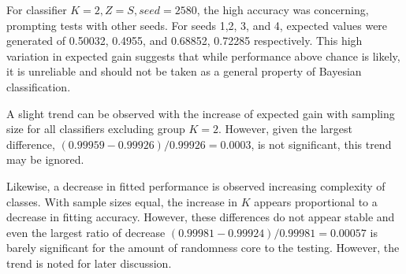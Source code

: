 \documentclass[10pt, conference]{IEEEtran}
\begin{document}
For classifier $K=2,Z=S,seed=2580$, the high accuracy was concerning, prompting tests with other seeds. For seeds 1,2, 3, and 4, expected values were generated of 0.50032, 0.4955, and 0.68852, 0.72285 respectively. This high variation in expected gain suggests that while performance above chance is likely, it is unreliable and should not be taken as a general property of Bayesian classification.

A slight trend can be observed with the increase of expected gain with sampling size for all classifiers excluding group $K=2$. However, given the largest difference, $(0.99959-0.99926)/0.99926 = 0.0003$, is not significant, this trend may be ignored. 

Likewise, a decrease in fitted performance is observed increasing complexity of classes. With sample sizes equal, the increase in $K$ appears proportional to a decrease in fitting accuracy. However, these differences do not appear stable and even the largest ratio of decrease $(0.99981-0.99924)/0.99981=0.00057$ is barely significant for the amount of randomness core to the testing. However, the trend is noted for later discussion. 
\end{document}
